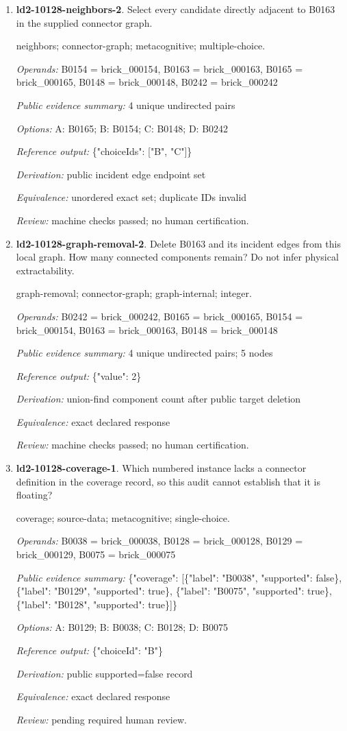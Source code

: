 \begin{enumerate}
\item \textbf{ld2-10128-neighbors-2}. Select every candidate directly adjacent to B0163 in the supplied connector graph.
\par{\small neighbors; connector-graph; metacognitive; multiple-choice.\par\textit{Operands:} B0154 = brick\_000154, B0163 = brick\_000163, B0165 = brick\_000165, B0148 = brick\_000148, B0242 = brick\_000242\par\textit{Public evidence summary:} 4 unique undirected pairs\par\textit{Options:} A: B0165; B: B0154; C: B0148; D: B0242\par\textit{Reference output:} \{"choiceIds": ["B", "C"]\}\par\textit{Derivation:} public incident edge endpoint set\par\textit{Equivalence:} unordered exact set; duplicate IDs invalid\par\textit{Review:} machine checks passed; no human certification.}
\item \textbf{ld2-10128-graph-removal-2}. Delete B0163 and its incident edges from this local graph. How many connected components remain? Do not infer physical extractability.
\par{\small graph-removal; connector-graph; graph-internal; integer.\par\textit{Operands:} B0242 = brick\_000242, B0165 = brick\_000165, B0154 = brick\_000154, B0163 = brick\_000163, B0148 = brick\_000148\par\textit{Public evidence summary:} 4 unique undirected pairs; 5 nodes\par\textit{Reference output:} \{"value": 2\}\par\textit{Derivation:} union-find component count after public target deletion\par\textit{Equivalence:} exact declared response\par\textit{Review:} machine checks passed; no human certification.}
\item \textbf{ld2-10128-coverage-1}. Which numbered instance lacks a connector definition in the coverage record, so this audit cannot establish that it is floating?
\par{\small coverage; source-data; metacognitive; single-choice.\par\textit{Operands:} B0038 = brick\_000038, B0128 = brick\_000128, B0129 = brick\_000129, B0075 = brick\_000075\par\textit{Public evidence summary:} \{"coverage": [\{"label": "B0038", "supported": false\}, \{"label": "B0129", "supported": true\}, \{"label": "B0075", "supported": true\}, \{"label": "B0128", "supported": true\}]\}\par\textit{Options:} A: B0129; B: B0038; C: B0128; D: B0075\par\textit{Reference output:} \{"choiceId": "B"\}\par\textit{Derivation:} public supported=false record\par\textit{Equivalence:} exact declared response\par\textit{Review:} pending required human review.}

\end{enumerate}
